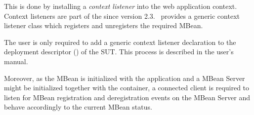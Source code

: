 This is done by installing a \emph{context listener} into the web
application context. Context listeners are part of the
 since version 2.3. \gbt\ provides a generic context
listener class which registers and unregisters the required MBean. 

The user is only required to add a generic context listener
declaration to the deployment descriptor () of the
SUT. This process is described in the user's manual.

Moreover, as the MBean is initialized with the application and a MBean
Server might be initialized together with the container, a connected
client is required to listen for MBean registration and deregistration
events on the MBean Server and behave accordingly to the current
MBean status.


